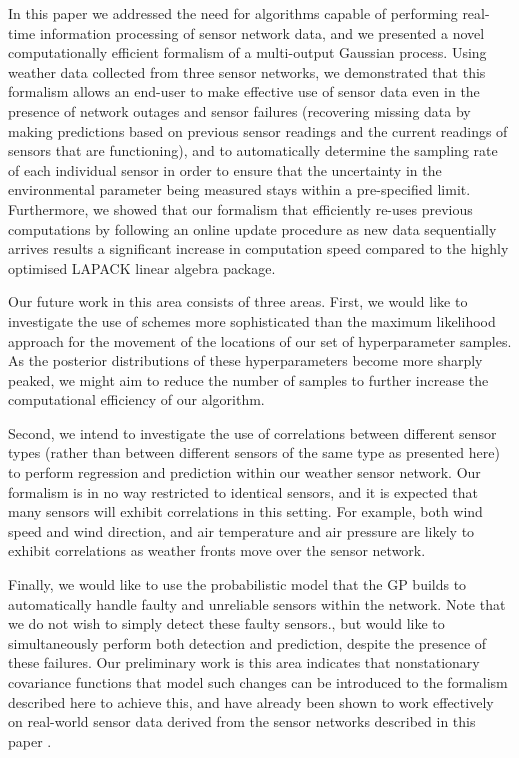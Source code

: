 \documentclass{acmtrans2m}
\begin{document}
\noindent In this paper we addressed the need for algorithms capable of performing real-time information processing of sensor network data, and we presented a novel computationally efficient formalism of a multi-output Gaussian process. Using weather data collected from three sensor networks, we demonstrated that this formalism allows an end-user to make effective use of sensor data even in the presence of network outages and sensor failures (recovering missing data by making predictions based on previous sensor readings and the current readings of sensors that are functioning), and to automatically determine the sampling rate of each individual sensor in order to ensure that the uncertainty in the environmental parameter being measured stays within a pre-specified limit. Furthermore, we showed that our formalism that efficiently re-uses previous computations by following an online update procedure as new data sequentially arrives results a significant increase in computation speed compared to the highly optimised LAPACK linear algebra package.

Our future work in this area consists of three areas. First, we would like to investigate the use of schemes more sophisticated than the maximum likelihood approach for the movement of the locations of our set of hyperparameter samples. As the posterior distributions of these hyperparameters become more sharply peaked, we might aim to reduce the number of samples to further increase the computational efficiency of our algorithm.

Second, we intend to investigate the use of correlations between different sensor types (rather than between different sensors of the same type as presented here) to perform regression and prediction within our weather sensor network. Our formalism is in no way restricted to identical sensors, and it is expected that many sensors will exhibit correlations in this setting. For example, both wind speed and wind direction, and air temperature and air pressure are likely to exhibit correlations as weather fronts move over the sensor network.

Finally, we would like to use the probabilistic model that the GP builds to automatically handle faulty and unreliable sensors within the network. Note that we do not wish to simply detect these faulty sensors., but would like to simultaneously perform both detection and prediction, despite the presence of these failures. Our preliminary work is this area indicates that nonstationary covariance functions that model such changes can be introduced to the formalism described here to achieve this, and have already been shown to work effectively on real-world sensor data derived from the sensor networks described in this paper \cite{changepoint}.
\end{document}
